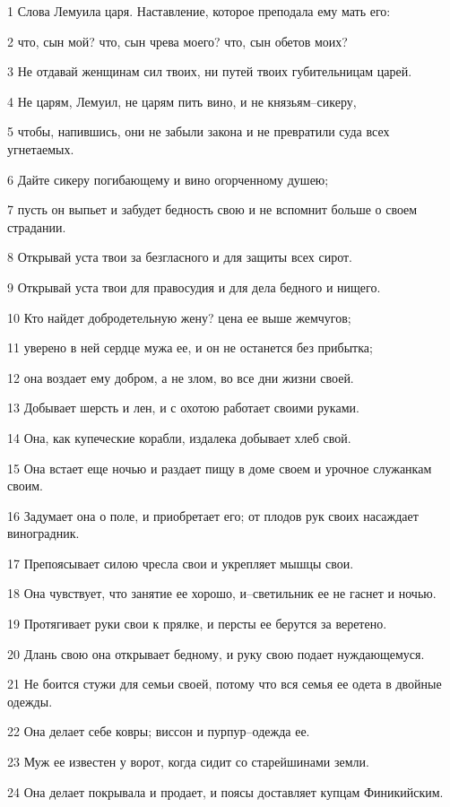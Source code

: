 \par 1 Слова Лемуила царя. Наставление, которое преподала ему мать его:
\par 2 что, сын мой? что, сын чрева моего? что, сын обетов моих?
\par 3 Не отдавай женщинам сил твоих, ни путей твоих губительницам царей.
\par 4 Не царям, Лемуил, не царям пить вино, и не князьям--сикеру,
\par 5 чтобы, напившись, они не забыли закона и не превратили суда всех угнетаемых.
\par 6 Дайте сикеру погибающему и вино огорченному душею;
\par 7 пусть он выпьет и забудет бедность свою и не вспомнит больше о своем страдании.
\par 8 Открывай уста твои за безгласного и для защиты всех сирот.
\par 9 Открывай уста твои для правосудия и для дела бедного и нищего.
\par 10 Кто найдет добродетельную жену? цена ее выше жемчугов;
\par 11 уверено в ней сердце мужа ее, и он не останется без прибытка;
\par 12 она воздает ему добром, а не злом, во все дни жизни своей.
\par 13 Добывает шерсть и лен, и с охотою работает своими руками.
\par 14 Она, как купеческие корабли, издалека добывает хлеб свой.
\par 15 Она встает еще ночью и раздает пищу в доме своем и урочное служанкам своим.
\par 16 Задумает она о поле, и приобретает его; от плодов рук своих насаждает виноградник.
\par 17 Препоясывает силою чресла свои и укрепляет мышцы свои.
\par 18 Она чувствует, что занятие ее хорошо, и--светильник ее не гаснет и ночью.
\par 19 Протягивает руки свои к прялке, и персты ее берутся за веретено.
\par 20 Длань свою она открывает бедному, и руку свою подает нуждающемуся.
\par 21 Не боится стужи для семьи своей, потому что вся семья ее одета в двойные одежды.
\par 22 Она делает себе ковры; виссон и пурпур--одежда ее.
\par 23 Муж ее известен у ворот, когда сидит со старейшинами земли.
\par 24 Она делает покрывала и продает, и поясы доставляет купцам Финикийским.
